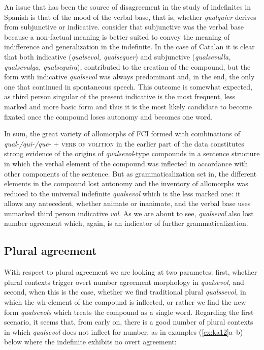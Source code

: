 \documentclass[output=paper,colorlinks,citecolor=brown]{langscibook}
\begin{document}
An issue that has been the source of disagreement in the study of indefinites in Spanish is that of the mood of the verbal base, that is, whether \textit{qualquier} derives from subjunctive or indicative. \citet[][120--121]{CompanyCompanyPozasLoyo2009} consider that subjunctive was the verbal base because a non-factual meaning is better suited to convey the meaning of indifference and generalization in the indefinite. In the case of Catalan it is clear that both indicative (\textit{qualsevol, qualsequer}) and subjunctive (\textit{qualsevulla, qualsevulga, qualsequira}), contributed to the creation of the compound, but the form with indicative \textit{qualsevol} was always predominant and, in the end, the only one that continued in spontaneous speech. This outcome is somewhat expected, as third person singular of the present indicative is the most frequent, less marked and more basic form and thus it is the most likely candidate to become fixated once the compound loses autonomy and becomes one word.

In sum, the great variety of allomorphs of FCI formed with combinations of \textit{qual-\slash qui-\slash que-} + \textsc{verb of volition} in the earlier part of the data constitutes strong evidence of the origins of \textit{qualsevol}-type compounds in a sentence structure in which the verbal element of the compound was inflected in accordance with other components of the sentence. But as grammaticalization set in, the different elements in the compound lost autonomy and the inventory of allomorphs was reduced to the universal indefinite \textit{qualsevol} which is the less marked one: it allows any antecedent, whether animate or inanimate, and the verbal base uses unmarked third person indicative \textit{vol}. As we are about to see, \textit{qualsevol} also lost number agreement which, again, is an indicator of further grammaticalization.


\subsection{Plural agreement}\label{sec:kea5.2}

With respect to plural agreement we are looking at two parametes: first, whether plural contexts trigger overt number agreement morphology in \textit{qualsevol}, and second, when this is the case, whether we find traditional plural \textit{qualssevol}, in which the wh-element of the compound is inflected, or rather we find the new form \textit{qualsevols} which treats the compound as a single word. Regarding the first scenario, it seems that, from early on, there is a good number of plural contexts in which \textit{qualsevol} does not inflect for number, as in examples (\ref{ex:ka12}a--b) below where the indefinite exhibits no overt agreement:
\end{document}
